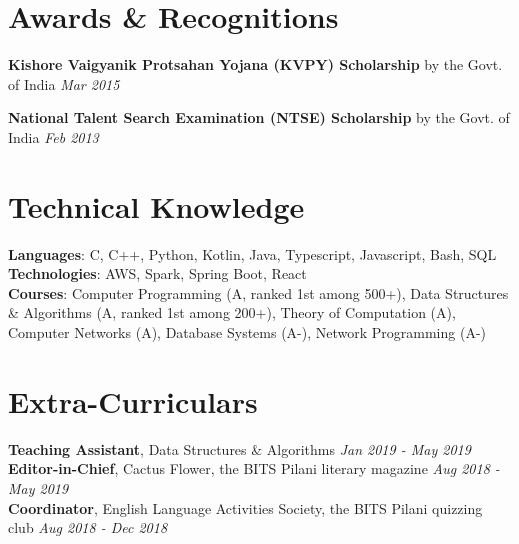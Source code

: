 \documentclass[letterpaper,11pt]{article}
\begin{document}
\section{Awards \& Recognitions}
\textbf{Kishore Vaigyanik Protsahan Yojana (KVPY) Scholarship}{ \small by the Govt. of India} \hfill \textit{\small Mar 2015}

\vspace{3mm}
\textbf{National Talent Search Examination (NTSE) Scholarship}{ \small by the Govt. of India} \hfill \textit{\small Feb 2013}

\section{Technical Knowledge}
\textbf{Languages}{: C, C++, Python, Kotlin, Java, Typescript, Javascript, Bash, SQL} \\
\vspace{3mm}
\textbf{Technologies}{: AWS, Spark, Spring Boot, React} \\
\vspace{3mm}
\textbf{Courses}{: Computer Programming (A, ranked 1st among 500+), Data Structures \& Algorithms (A, ranked 1st among 200+), Theory of Computation (A), Computer Networks (A), Database Systems (A-), Network Programming (A-)}

\section{Extra-Curriculars}
\textbf{Teaching Assistant}{, Data Structures \& Algorithms} \hfill \textit{\small Jan 2019 - May 2019} \\
\vspace{3mm}
\textbf{Editor-in-Chief}{, Cactus Flower, the BITS Pilani literary magazine} \hfill \textit{\small Aug 2018 - May 2019} \\
\vspace{3mm}
\textbf{Coordinator}{, English Language Activities Society, the BITS Pilani quizzing club} \hfill \textit{\small Aug 2018 - Dec 2018}

\end{document}
